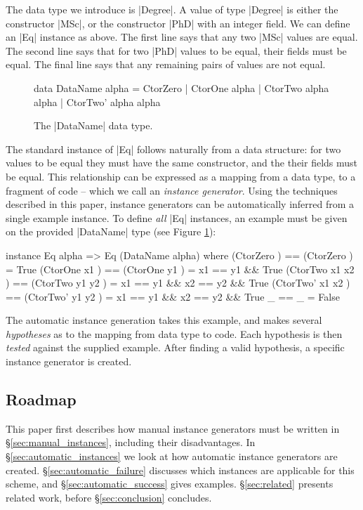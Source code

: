 \documentclass{llncs}
\begin{document}
The data type we introduce is |Degree|. A value of type |Degree| is either the constructor |MSc|, or the constructor |PhD| with an integer field. We can define an |Eq| instance as above. The first line says that any two |MSc| values are equal. The second line says that for two |PhD| values to be equal, their fields must be equal. The final line says that any remaining pairs of values are not equal.

\begin{figure}
\begin{code}
data DataName alpha = CtorZero | CtorOne alpha | CtorTwo alpha alpha | CtorTwo' alpha alpha
\end{code}
\caption{The |DataName| data type.}
\label{fig:dataname}
\end{figure}

The standard instance of |Eq| follows naturally from a data structure: for two values to be equal they must have the same constructor, and the their fields must be equal. This relationship can be expressed as a mapping from a data type, to a fragment of code -- which we call an \textit{instance generator}. Using the techniques described in this paper, instance generators can be automatically inferred from a single example instance. To define \textit{all} |Eq| instances, an example must be given on the provided |DataName| type (see Figure \ref{fig:dataname}):

\begin{code}
instance Eq alpha => Eq (DataName alpha) where
    (CtorZero         )  == (CtorZero         )  = True
    (CtorOne   x1     )  == (CtorOne   y1     )  = x1 == y1 && True
    (CtorTwo   x1 x2  )  == (CtorTwo   y1 y2  )  = x1 == y1 && x2 == y2 && True
    (CtorTwo'  x1 x2  )  == (CtorTwo'  y1 y2  )  = x1 == y1 && x2 == y2 && True
    _                    == _                    = False
\end{code}

The automatic instance generation takes this example, and makes several \textit{hypotheses} as to the mapping from data type to code. Each hypothesis is then \textit{tested} against the supplied example. After finding a valid hypothesis, a specific instance generator is created.

\subsection{Roadmap}

This paper first describes how manual instance generators must be written in \S\ref{sec:manual_instances}, including their disadvantages. In \S\ref{sec:automatic_instances} we look at how automatic instance generators are created. \S\ref{sec:automatic_failure} discusses which instances are applicable for this scheme, and \S\ref{sec:automatic_success} gives examples. \S\ref{sec:related} presents related work, before \S\ref{sec:conclusion} concludes.
\end{document}
